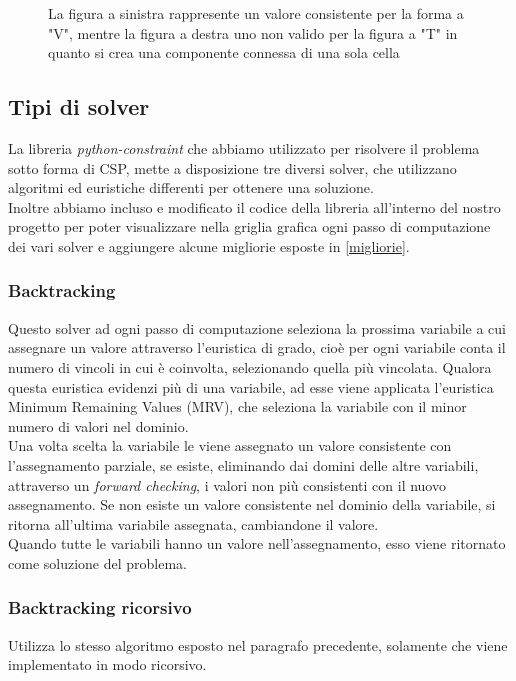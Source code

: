 \begin{figure}[h]
	\caption{La figura a sinistra rappresente un valore consistente per la forma a "V", mentre la figura a destra uno non valido per la figura a "T" in quanto si crea una componente connessa di una sola cella}
	\label{fig:badCC}
\end{figure}

\subsection{Tipi di solver}
La libreria \textit{python-constraint} che abbiamo utilizzato per risolvere il problema sotto forma di CSP, mette a disposizione tre diversi solver, che utilizzano algoritmi ed euristiche differenti per ottenere una soluzione. \\
Inoltre abbiamo incluso e modificato il codice della libreria all'interno del nostro progetto per poter visualizzare nella griglia grafica ogni passo di computazione dei vari solver e aggiungere alcune migliorie esposte in \ref{migliorie}.

\subsubsection{Backtracking}
Questo solver ad ogni passo di computazione seleziona la prossima variabile a cui assegnare un valore attraverso l'euristica di grado, cioè per ogni variabile conta il numero di vincoli in cui è coinvolta, selezionando quella più vincolata. Qualora questa euristica evidenzi più di una variabile, ad esse viene applicata l'euristica Minimum Remaining Values (MRV), che seleziona la variabile con il minor numero di valori nel dominio.\\
Una volta scelta la variabile le viene assegnato un valore consistente con l'assegnamento parziale, se esiste, eliminando dai domini delle altre variabili, attraverso un \textit{forward checking}, i valori non più consistenti con il nuovo assegnamento. Se non esiste un valore consistente nel dominio della variabile, si ritorna all'ultima variabile assegnata, cambiandone il valore. \\
Quando tutte le variabili hanno un valore nell'assegnamento, esso viene ritornato come soluzione del problema.
\subsubsection{Backtracking ricorsivo}
Utilizza lo stesso algoritmo esposto nel paragrafo precedente, solamente che viene implementato in modo ricorsivo.
